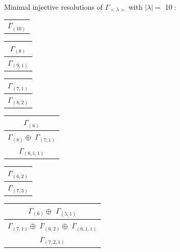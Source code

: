 \documentclass[main.tex]{subfiles}
\begin{document}
\bigskip
Minimal injective resolutions of $\Gamma_{<\lambda>}$ with $|\lambda| = $ 10 : \\
\begin{minipage}{.2\textwidth}
\centering
\begin{tabular}{c}
$\Gamma_{(
10
)}$
\\
\end{tabular}\end{minipage}
\begin{minipage}{.2\textwidth}
\centering
\begin{tabular}{c}
$\Gamma_{(
8
)}$
\\ \hline
$\Gamma_{(
9 , 
1
)}$
\\
\end{tabular}\end{minipage}
\begin{minipage}{.2\textwidth}
\centering
\begin{tabular}{c}
$\Gamma_{(
7 , 
1
)}$
\\ \hline
$\Gamma_{(
8 , 
2
)}$
\\
\end{tabular}\end{minipage}
\begin{minipage}{.2\textwidth}
\centering
\begin{tabular}{c}
$\Gamma_{(
6
)}$
\\ \hline
$\Gamma_{(
8
)} \oplus$
$\Gamma_{(
7 , 
1
)}$
\\ \hline
$\Gamma_{(
8 , 
1 , 
1
)}$
\\
\end{tabular}\end{minipage}
\begin{minipage}{.2\textwidth}
\centering
\begin{tabular}{c}
$\Gamma_{(
6 , 
2
)}$
\\ \hline
$\Gamma_{(
7 , 
3
)}$
\\
\end{tabular}\end{minipage}
\bigskip
\begin{minipage}{.3\textwidth}
\centering
\begin{tabular}{c}
$\Gamma_{(
6
)} \oplus$
$\Gamma_{(
5 , 
1
)}$
\\ \hline
$\Gamma_{(
7 , 
1
)} \oplus$
$\Gamma_{(
6 , 
2
)} \oplus$
$\Gamma_{(
6 , 
1 , 
1
)}$
\\ \hline
$\Gamma_{(
7 , 
2 , 
1
)}$
\\
\end{tabular}\end{minipage}
\end{document}
